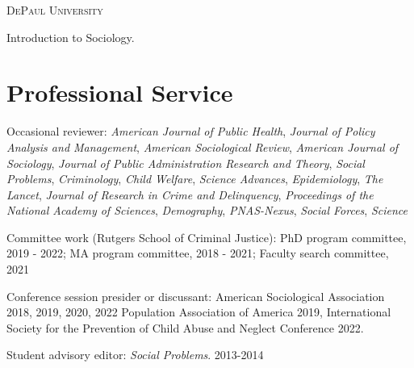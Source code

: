 \documentclass[margin,line]{res}
\newenvironment{list1}{
  \begin{list}{\ding{113}}{%
      \setlength{\itemsep}{0in}
      \setlength{\parsep}{0in} \setlength{\parskip}{0in}
      \setlength{\topsep}{0in} \setlength{\partopsep}{0in}
      \setlength{\leftmargin}{0.17in}}}{\end{list}}
\begin{document}
\begin{resume}
\begin{list1}
\end{list1}

\textsc{DePaul University}

\begin{list1}

  \item[] Introduction to Sociology.

\end{list1}

\section{\sc Professional Service}

Occasional reviewer: \textit{American Journal of Public Health}, \textit{Journal of Policy Analysis and Management}, \textit{American Sociological Review}, \textit{American Journal of Sociology}, \textit{Journal of Public Administration Research and Theory}, \textit{Social Problems}, \textit{Criminology}, \textit{Child Welfare}, \textit{Science Advances}, \textit{Epidemiology}, \textit{The Lancet}, \textit{Journal of Research in Crime and Delinquency}, \textit{Proceedings of the National Academy of Sciences}, \textit{Demography}, \textit{PNAS-Nexus}, \textit{Social Forces}, \textit{Science}

Committee work (Rutgers School of Criminal Justice): PhD program committee, 2019 - 2022; MA program committee, 2018 - 2021; Faculty search committee, 2021

Conference session presider or discussant: American Sociological Association 2018, 2019, 2020, 2022 Population Association of America 2019, International Society for the Prevention of Child Abuse and Neglect Conference 2022.

Student advisory editor: \textit{Social Problems}. 2013-2014

\end{resume}
\end{document}
